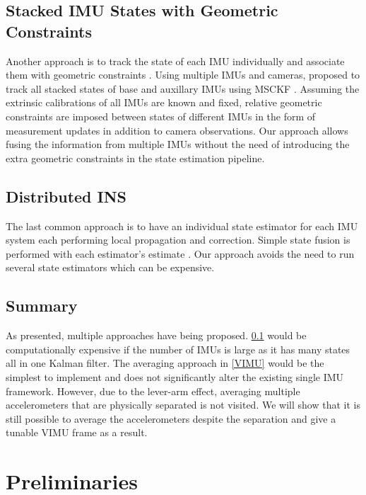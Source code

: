 \documentclass[conference]{IEEEtran}
\begin{document}
\subsection{Stacked IMU States with Geometric Constraints}\label{constraint}

Another approach is to track the state of each IMU individually and associate them with geometric constraints \cite{waegli2008, Beaudoin2018_satelite}. Using multiple IMUs and cameras, \cite{Eckenhoff2021_MIMC-VINS} proposed to track all stacked states of base and auxillary IMUs using MSCKF \cite{Anastasios2007_MSCKF}. Assuming the extrinsic calibrations of all IMUs are known and fixed, relative geometric constraints are imposed between states of different IMUs in the form of measurement updates in addition to camera observations. Our approach allows fusing the information from multiple IMUs without the need of introducing the extra geometric constraints in the state estimation pipeline.

\subsection{Distributed INS}\label{distributed}

The last common approach is to have an individual state estimator for each IMU system each performing local propagation and correction. Simple state fusion is performed with each estimator's estimate \cite{Bancroft2011DataFA, patel2022_multi-imu}. Our approach avoids the need to run several state estimators which can be expensive.

\subsection{Summary}

As presented, multiple approaches have being proposed. \ref{constraint} would be computationally expensive if the number of IMUs is large as it has many states all in one Kalman filter. The averaging approach in \ref{VIMU} would be the simplest to implement and does not significantly alter the existing single IMU framework. However, due to the lever-arm effect, averaging multiple accelerometers that are physically separated is not visited. We will show that it is still possible to average the accelerometers despite the separation and give a tunable VIMU frame as a result.

\section{Preliminaries}
\end{document}

